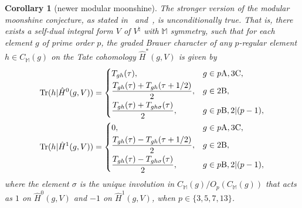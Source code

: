 \documentclass[pdftex]{sigma}
\newcommand{\bM}{\mathbb{M}}
\DeclareMathOperator{\Tr}{Tr}
\newtheorem{cor}[thm]{Corollary}
\theoremstyle{definition}
\begin{document}
\begin{cor}[newer modular moonshine] The stronger version of the modular moonshine conjecture, as stated in~{\rm \cite{BR96}} and~{\rm \cite{B98}}, is unconditionally true. That is, there exists a self-dual integral form $V$ of $V^\natural$ with $\bM$ symmetry, such that for each element $g$ of prime order $p$, the graded Brauer character of any $p$-regular element $h \in C_\bM(g)$ on the Tate cohomology $\hat{H}^*(g,V)$ is given by
 \begin{gather*}
\Tr(h | \hat{H}^0(g,V)) = \begin{cases} T_{gh}(\tau), & g \in p\text{A}, 3\text{C}, \vspace{1mm}\\ \dfrac{T_{gh}(\tau) + T_{gh}(\tau+1/2)}{2}, & g \in 2\text{B}, \vspace{1mm}\\ \dfrac{T_{gh}(\tau) + T_{gh\sigma}(\tau)}{2}, & g \in p\text{B}, 2|(p-1), \end{cases} \\
\Tr(h|\hat{H}^1(g,V)) = \begin{cases} 0, & g \in p\text{A}, 3\text{C}, \vspace{1mm}\\ \dfrac{T_{gh}(\tau) - T_{gh}(\tau+1/2)}{2}, & g \in 2\text{B}, \vspace{1mm}\\ \dfrac{T_{gh}(\tau) - T_{gh\sigma}(\tau)}{2}, & g \in p\text{B}, 2|(p-1), \end{cases}
\end{gather*}
where the element $\sigma$ is the unique involution in $C_\bM(g)/O_p(C_\bM(g))$ that acts as $1$ on $\hat{H}^0(g,V)$ and $-1$ on $\hat{H}^1(g,V)$, when $p \in \{3,5,7,13\}$.
\end{cor}
\end{document}

